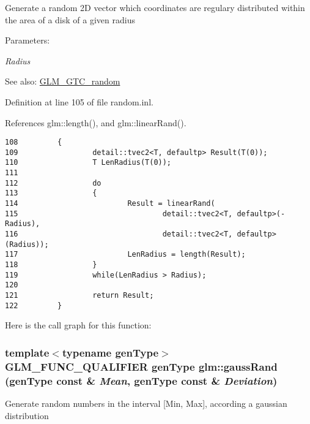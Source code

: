 Generate a random 2D vector which coordinates are regulary distributed within the area of a disk of a given radius

\begin{Desc}
\item[Parameters:]
\begin{description}
\item[{\em Radius}]\end{description}
\end{Desc}
\begin{Desc}
\item[See also:]\hyperlink{group__gtc__random}{GLM\_\-GTC\_\-random} \end{Desc}


Definition at line 105 of file random.inl.

References glm::length(), and glm::linearRand().

\begin{Code}\begin{verbatim}108         {               
109                 detail::tvec2<T, defaultp> Result(T(0));
110                 T LenRadius(T(0));
111                 
112                 do
113                 {
114                         Result = linearRand(
115                                 detail::tvec2<T, defaultp>(-Radius),
116                                 detail::tvec2<T, defaultp>(Radius));
117                         LenRadius = length(Result);
118                 }
119                 while(LenRadius > Radius);
120                 
121                 return Result;
122         }
\end{verbatim}
\end{Code}




Here is the call graph for this function:\hypertarget{group__gtc__random_gc045638daf634b0221ef4baaaf643cb2}{
\subsubsection[gaussRand]{\setlength{\rightskip}{0pt plus 5cm}template$<$typename genType$>$ GLM\_\-FUNC\_\-QUALIFIER genType glm::gaussRand (genType const \& {\em Mean}, \/  genType const \& {\em Deviation})}}
\label{group__gtc__random_gc045638daf634b0221ef4baaaf643cb2}


Generate random numbers in the interval \mbox{[}Min, Max\mbox{]}, according a gaussian distribution

